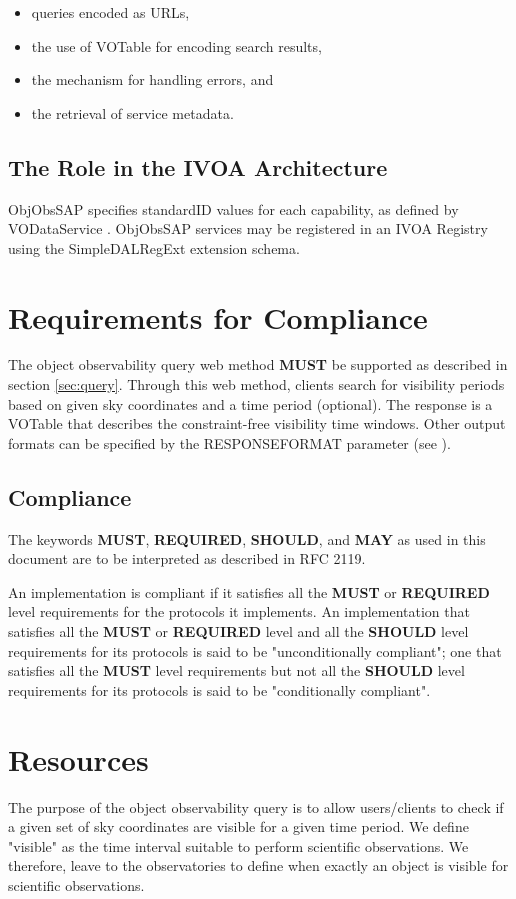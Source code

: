\documentclass[11pt,a4paper]{ivoatex/ivoa}
\begin{document}
\begin{itemize}
\item queries encoded as URLs,
\item the use of VOTable for encoding search results,
\item the mechanism for handling errors, and
\item the retrieval of service metadata.
\end{itemize}


\subsection{The Role in the IVOA Architecture}
ObjObsSAP specifies standardID values \citep{2016ivoa.spec.0523D} for each
capability, as defined by VODataService \citep{2010ivoa.spec.1202P}. ObjObsSAP
services may be registered in an IVOA Registry using the SimpleDALRegExt
\citep{2017ivoa.spec.0530P} extension schema.


\section{Requirements for Compliance}
The object observability query web method \textbf{MUST} be supported as described
in section \ref{sec:query}. Through this web method, clients search for visibility
periods based on given sky coordinates and a time period (optional). The
response is a VOTable that describes the constraint-free visibility time
windows. Other output formats can be specified by the RESPONSEFORMAT
parameter (see \citet{2017ivoa.spec.0517D}).

\subsection{Compliance}
The keywords \textbf{MUST}, \textbf{REQUIRED}, \textbf{SHOULD},
and \textbf{MAY} as used in this document are to be interpreted as
described in RFC 2119.

An implementation is compliant if it satisfies all the \textbf{MUST}
or \textbf{REQUIRED} level requirements for the protocols it
implements. An implementation that satisfies all the \textbf{MUST} or
\textbf{REQUIRED} level and all the \textbf{SHOULD} level
requirements for its protocols is said to be "unconditionally
compliant"; one that satisfies all the \textbf{MUST} level
requirements but not all the \textbf{SHOULD} level requirements for
its protocols is said to be "conditionally compliant".

\section{Resources}
The purpose of the object observability query is to allow users/clients to
check if a given set of sky coordinates are visible for a given time
period. We define "visible" as the time interval suitable to perform
scientific observations. We therefore, leave to the observatories to
define when exactly an object is visible for scientific observations.
\end{document}
